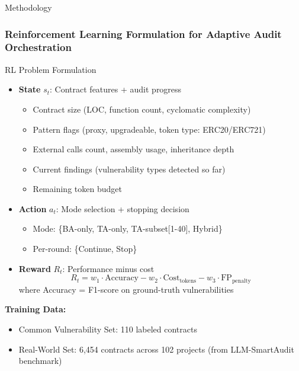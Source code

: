 \documentclass[aspectratio=169]{beamer}
\begin{document}
\begin{frame}{Methodology}
\frametitle{Reinforcement Learning Formulation for Adaptive Audit Orchestration}

\begin{block}{RL Problem Formulation}
\begin{itemize}
    \item \textbf{State} $s_t$: Contract features + audit progress
    \begin{itemize}
        \item Contract size (LOC, function count, cyclomatic complexity)
        \item Pattern flags (proxy, upgradeable, token type: ERC20/ERC721)
        \item External calls count, assembly usage, inheritance depth
        \item Current findings (vulnerability types detected so far)
        \item Remaining token budget
    \end{itemize}
    
    \item \textbf{Action} $a_t$: Mode selection + stopping decision
    \begin{itemize}
        \item Mode: \{BA-only, TA-only, TA-subset[1-40], Hybrid\}
        \item Per-round: \{Continue, Stop\}
    \end{itemize}
    
    \item \textbf{Reward} $R_t$: Performance minus cost
    \begin{equation*}
    R_t = w_1 \cdot \text{Accuracy} - w_2 \cdot \text{Cost}_{\text{tokens}} - w_3 \cdot \text{FP}_{\text{penalty}}
    \end{equation*}
    where Accuracy = F1-score on ground-truth vulnerabilities
\end{itemize}
\end{block}

\vspace{0.3cm}

\textbf{Training Data:}
\begin{itemize}
    \item Common Vulnerability Set: 110 labeled contracts
    \item Real-World Set: 6,454 contracts across 102 projects (from LLM-SmartAudit benchmark)
\end{itemize}

\end{frame}
\end{document}

